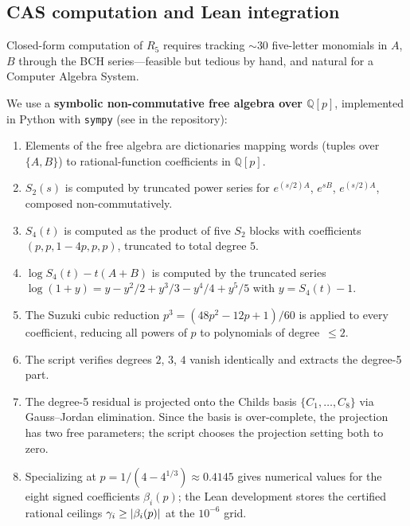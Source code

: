 \subsection{CAS computation and Lean integration}
\label{sec:cas}

Closed-form computation of $R_5$ requires tracking $\sim 30$ five-letter
monomials in $A$, $B$ through the BCH series---feasible but tedious by hand,
and natural for a Computer Algebra System.

We use a \textbf{symbolic non-commutative free algebra over $\mathbb{Q}[p]$},
implemented in Python with \texttt{sympy} (see
in the repository):
\begin{enumerate}
  \item Elements of the free algebra are dictionaries mapping words
    (tuples over $\{A, B\}$) to rational-function coefficients in
    $\mathbb{Q}[p]$.
  \item $S_2(s)$ is computed by truncated power series for $e^{(s/2)A}$,
    $e^{sB}$, $e^{(s/2)A}$, composed non-commutatively.
  \item $S_4(t)$ is computed as the product of five $S_2$ blocks with
    coefficients $(p, p, 1{-}4p, p, p)$, truncated to total degree $5$.
  \item $\log S_4(t) - t(A+B)$ is computed by the truncated series
    $\log(1 + y) = y - y^2/2 + y^3/3 - y^4/4 + y^5/5$ with
    $y = S_4(t) - 1$.
  \item The Suzuki cubic reduction $p^3 = (48p^2 - 12p + 1)/60$
    is applied to every coefficient, reducing all powers of $p$ to
    polynomials of degree~$\le 2$.
  \item The script verifies degrees $2$, $3$, $4$ vanish identically and
    extracts the degree-5 part.
  \item The degree-5 residual is projected onto the Childs
    basis $\{C_1, \ldots, C_8\}$ via Gauss--Jordan elimination.
    Since the basis is over-complete, the projection has two free
    parameters; the script chooses the projection setting both to zero.
  \item Specializing at $p = 1/(4-4^{1/3}) \approx 0.4145$ gives numerical
    values for the eight signed coefficients $\beta_i(p)$; the Lean
    development stores the certified rational ceilings
    $\gamma_i \ge \left|\beta_i(p)\right|$ at the $10^{-6}$ grid.
\end{enumerate}

